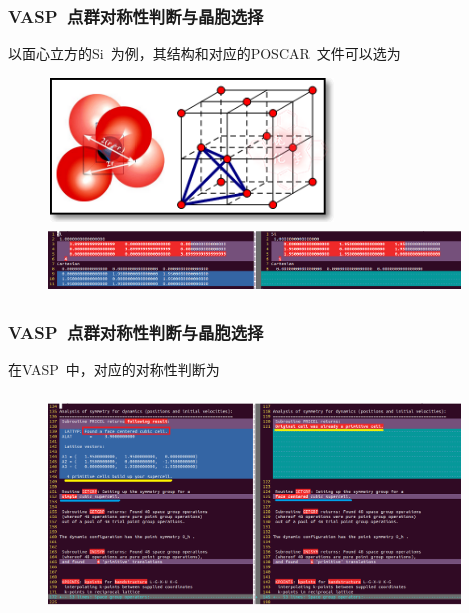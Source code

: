 \documentclass[cjk,slidestop,handout,compress,mathserif,blue]{beamer}	%
\begin{document}
\frame
{
	\frametitle{\textrm{VASP~}点群对称性判断与晶胞选择}
	以面心立方的\textrm{Si~}为例，其结构和对应的\textrm{POSCAR~}文件可以选为
\begin{figure}[h!]
\centering
\vspace*{-0.1in}
\includegraphics[height=1.5in,width=3.0in,viewport=0 0 350 160,clip]{Figures/FCC_Si.png}
\vskip 0.1in
\hspace*{-0.15in}
\includegraphics[height=0.7in,width=4.3in,viewport=0 0 1080 160,clip]{Figures/VASP_FCC_Si_POSCAR.png}
\caption{\fontsize{7.2pt}{4.2pt}}%
\label{FCC_Si-POSCAR}
\end{figure} 
}

\frame
{
	\frametitle{\textrm{VASP~}点群对称性判断与晶胞选择}
	在\textrm{VASP~}中，对应的对称性判断为
\begin{figure}[h!]
\centering
\vspace*{-0.1in}
\hspace*{-0.15in}
\includegraphics[height=2.3in,width=4.3in,viewport=0 0 1080 530,clip]{Figures/VASP_FCC_Si_symmetry.png}
\label{FCC_Si-OUTCAR}
\end{figure} 
}
\end{document}
